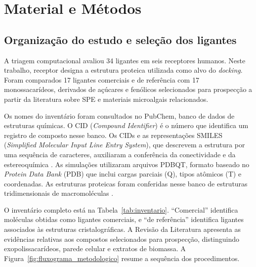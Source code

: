 \section{Material e Métodos}
\setcounter{table}{0} %
\subsection{Organização do estudo e seleção dos ligantes}
A triagem computacional avaliou 34 ligantes em seis receptores humanos. Neste trabalho, receptor designa a estrutura proteica utilizada como alvo do \textit{docking}. Foram comparados 17 ligantes comerciais e de referência com 17 monossacarídeos, derivados de açúcares e fenólicos selecionados para prospecção a partir da literatura sobre SPE e materiais microalgais relacionados.

Os nomes do inventário foram consultados no PubChem, banco de dados de estruturas químicas. O CID (\textit{Compound Identifier}) é o número que identifica um registro de composto nesse banco. Os CIDs e as representações SMILES (\textit{Simplified Molecular Input Line Entry System}), que descrevem a estrutura por uma sequência de caracteres, auxiliaram a conferência da conectividade e da estereoquímica \parencite{pubchem2023}. As simulações utilizaram arquivos PDBQT, formato baseado no \textit{Protein Data Bank} (PDB) que inclui cargas parciais (Q), tipos atômicos (T) e coordenadas. As estruturas proteicas foram conferidas nesse banco de estruturas tridimensionais de macromoléculas \parencite{berman2000pdb}.

O inventário completo está na Tabela~\ref{tab:inventario}. ``Comercial'' identifica moléculas obtidas como ligantes comerciais, e ``de referência'' identifica ligantes associados às estruturas cristalográficas. A Revisão da Literatura apresenta as evidências relativas aos compostos selecionados para prospecção, distinguindo exopolissacarídeos, parede celular e extratos de biomassa. A Figura~\ref{fig:fluxograma_metodologico} resume a sequência dos procedimentos.


